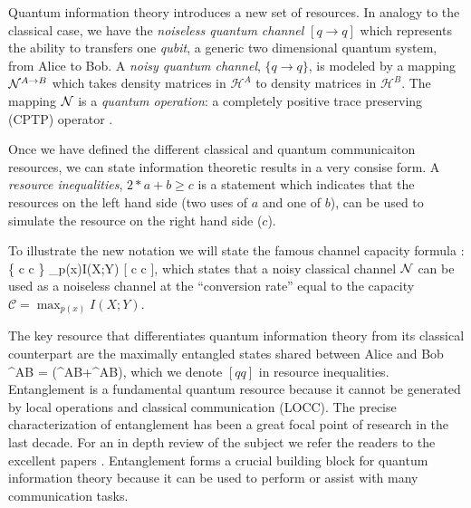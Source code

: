 \documentclass[aps,11pt,twoside,letterpaper]{article}
\def\cH{\mathcal{H}}
\begin{document}
			Quantum information theory introduces a new set of resources. 
			In analogy to the classical case, we have the \emph{noiseless quantum channel} $[q \to q]$ which 
			represents the ability to transfers one \emph{qubit}, a generic two dimensional quantum system, 
			from Alice to Bob.
			A \emph{noisy quantum channel}, $\{q \to q\}$, is modeled by a mapping ${\cal N}^{A \to B}$ 
			which takes density matrices in $\cH^A$ to density matrices in $\cH^B$.
			The mapping ${\cal N}$ is a \emph{quantum operation}: a completely positive trace preserving (CPTP) 
			operator \cite{NC04}.
		
            Once we have defined the different classical and quantum communicaiton resources,
            we can state information theoretic results in a very consise form.
            A \emph{resource inequalities}, $2*a+b \geq c$ is a statement which indicates that 
            the resources on the left hand side (two uses of $a$ and one of $b$),
            can be used to simulate the resource on the right hand side ($c$).

            To illustrate the new notation we will state the famous channel
            capacity formula \cite{S48}:
            \be
                \{ c \to c \} \geq \max_{p(x)}I(X;Y) [  c \to c ],
            \ee
            which states that a noisy classical channel ${\cal N}$ can be used as a noiseless channel
            at the ``conversion rate'' equal to the capacity $\mathcal{C} = \max_{p(x)}I(X;Y)$.

			The key resource that differentiates quantum information theory 
            from its classical counterpart are the maximally entangled states shared between 
			Alice and Bob 
			\be
				\ket{\Phi}^{AB} = (^{AB}+^{AB}),
			\ee
			which we denote $[qq]$ in resource inequalities.  
			Entanglement is a fundamental quantum resource because it cannot be generated by local operations and
			classical communication (LOCC). 
			The precise characterization of entanglement has been a great focal point of research in the last decade.
			For an in depth review of the subject we refer the readers to the excellent papers \cite{VP98, HHHH}.
			Entanglement forms a crucial building block for quantum information theory because it can be used 
			to perform or assist with many communication tasks.
\end{document}
